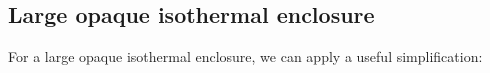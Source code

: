 
    
    


\subsection*{Large opaque isothermal enclosure}
For a large opaque isothermal enclosure, we can apply a useful simplification:

